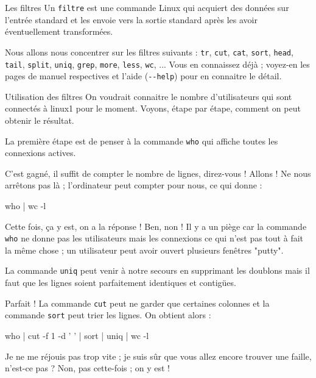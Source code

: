 \documentclass[a4paper,11pt]{article}
\begin{document}
		\begin{coltbox}{Les filtres}
				Un \verb_filtre_ est une commande Linux qui acquiert des donn\'ees sur l'entr\'ee standard 
				et les envoie vers la sortie standard apr\`es les avoir \'eventuellement transform\'ees.
		\end{coltbox}

		Nous allons nous concentrer sur les filtres suivants :
		\verb_tr_, \verb_cut_, \verb_cat_, \verb_sort_, \verb_head_, \verb_tail_, 
		\verb_split_, \verb_uniq_, \verb_grep_, \verb_more_, \verb_less_, \verb_wc_, ...
		Vous en connaissez d\'ej\`a ; voyez-en les pages de manuel respectives et l'aide (\verb_--help_) pour en connaitre le d\'etail.
				
           
			
		\begin{Tutoriel}{Utilisation des filtres}
					On voudrait connaitre le nombre d'utilisateurs qui sont connect\'es \`a linux1 pour le moment.
					Voyons, \'etape par \'etape, comment on peut obtenir le r\'esultat.
				
           		\begin{steps}
				
				\item La premi\`ere \'etape est de penser \`a la commande \verb_who_
					qui affiche toutes les connexions actives.
					
				\item C'est gagn\'e, il suffit de compter le nombre de lignes, direz-vous !
						Allons ! Ne nous arr\^etons pas l\`a ; l'ordinateur peut compter pour nous,
						ce qui donne :
						\begin{Console}
							who | wc -l
						\end{Console}
						
				\item Cette fois, \c ca y est, on a la r\'eponse ! Ben, non !
					Il y a un pi\`ege car la commande \verb_who_ ne donne pas les utilisateurs
					mais les connexions ce qui n'est pas tout \`a fait la m\^eme chose ;
					un utilisateur peut avoir ouvert plusieurs fen\^etres "putty". 
						
            \par
        
					La commande \verb_uniq_ peut venir \`a notre secours en supprimant
					les doublons mais il faut que les lignes soient parfaitement identiques
					et contig\"ues.
						
            \par
        
					Parfait ! La commande \verb_cut_ peut ne garder que certaines colonnes
					et la commande \verb_sort_ peut trier les lignes. On obtient alors :							
						
            \par
        					\begin{Console}
						who | cut -f 1 -d ' ' | sort | uniq | wc -l
					\end{Console}
					
					Je ne me r\'ejouis pas trop vite ; je suis s\^ur que vous allez encore
					trouver une faille, n'est-ce pas ? Non, pas cette-fois ; on y est !
			\end{steps}
		\end{Tutoriel}
\end{document}
